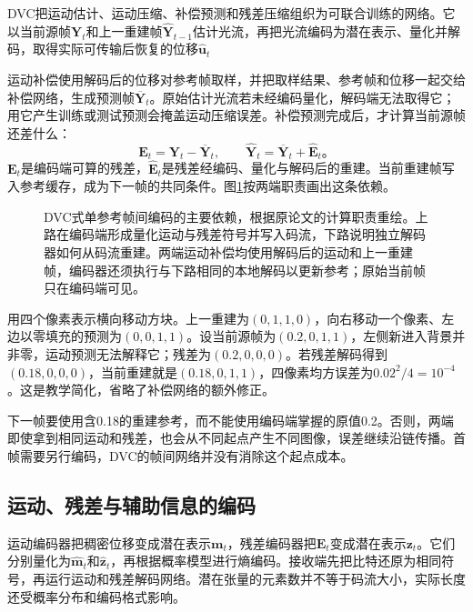 DVC把运动估计、运动压缩、补偿预测和残差压缩组织为可联合训练的网络。它以当前源帧$\bm{Y}_t$和上一重建帧$\widehat{\bm{Y}}_{t-1}$估计光流，再把光流编码为潜在表示、量化并解码，取得实际可传输后恢复的位移$\widehat{\bm{u}}_t$

运动补偿使用解码后的位移对参考帧取样，并把取样结果、参考帧和位移一起交给补偿网络，生成预测帧$\overline{\bm{Y}}_t$。原始估计光流若未经编码量化，解码端无法取得它；用它产生训练或测试预测会掩盖运动压缩误差。补偿预测完成后，才计算当前源帧还差什么：
\begin{equation}
  \bm{E}_t=\bm{Y}_t-\overline{\bm{Y}}_t,\qquad
  \widehat{\bm{Y}}_t=\overline{\bm{Y}}_t+\widehat{\bm{E}}_t\text{。}
  \label{eq:vision-video-dvc-reconstruction}
\end{equation}
$\bm{E}_t$是编码端可算的残差，$\widehat{\bm{E}}_t$是残差经编码、量化与解码后的重建。当前重建帧写入参考缓存，成为下一帧的共同条件。图\ref{fig:vision-dvc-reference}按两端职责画出这条依赖。

\begin{figure}[htbp]
  \centering
  
  \caption{DVC式单参考帧间编码的主要依赖，根据原论文的计算职责重绘。上路在编码端形成量化运动与残差符号并写入码流，下路说明独立解码器如何从码流重建。两端运动补偿均使用解码后的运动和上一重建帧，编码器还须执行与下路相同的本地解码以更新参考；原始当前帧只在编码端可见。}
  \label{fig:vision-dvc-reference}
\end{figure}
\FloatBarrier

用四个像素表示横向移动方块。上一重建为$(0,1,1,0)$，向右移动一个像素、左边以零填充的预测为$(0,0,1,1)$。设当前源帧为$(0.2,0,1,1)$，左侧新进入背景并非零，运动预测无法解释它；残差为$(0.2,0,0,0)$。若残差解码得到$(0.18,0,0,0)$，当前重建就是$(0.18,0,1,1)$，四像素均方误差为$0.02^2/4=10^{-4}$。这是教学简化，省略了补偿网络的额外修正。

下一帧要使用含0.18的重建参考，而不能使用编码端掌握的原值0.2。否则，两端即使拿到相同运动和残差，也会从不同起点产生不同图像，误差继续沿链传播。首帧需要另行编码，DVC的帧间网络并没有消除这个起点成本。

\subsection{运动、残差与辅助信息的编码}
\label{sec:vision-video-rate-allocation}

运动编码器把稠密位移变成潜在表示$\bm{m}_t$，残差编码器把$\bm{E}_t$变成潜在表示$\bm{z}_t$。它们分别量化为$\widehat{\bm{m}}_t$和$\widehat{\bm{z}}_t$，再根据概率模型进行熵编码。接收端先把比特还原为相同符号，再运行运动和残差解码网络。潜在张量的元素数并不等于码流大小，实际长度还受概率分布和编码格式影响。

